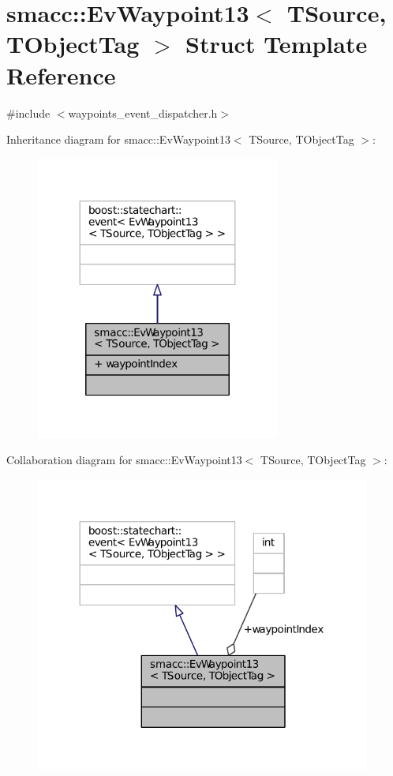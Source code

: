 \hypertarget{structsmacc_1_1EvWaypoint13}{}\section{smacc\+:\+:Ev\+Waypoint13$<$ T\+Source, T\+Object\+Tag $>$ Struct Template Reference}
\label{structsmacc_1_1EvWaypoint13}


{\ttfamily \#include $<$waypoints\+\_\+event\+\_\+dispatcher.\+h$>$}



Inheritance diagram for smacc\+:\+:Ev\+Waypoint13$<$ T\+Source, T\+Object\+Tag $>$\+:
\nopagebreak
\begin{figure}[H]
\begin{center}
\leavevmode
\includegraphics[width=227pt]{structsmacc_1_1EvWaypoint13__inherit__graph}
\end{center}
\end{figure}


Collaboration diagram for smacc\+:\+:Ev\+Waypoint13$<$ T\+Source, T\+Object\+Tag $>$\+:
\nopagebreak
\begin{figure}[H]
\begin{center}
\leavevmode
\includegraphics[width=312pt]{structsmacc_1_1EvWaypoint13__coll__graph}
\end{center}
\end{figure}
